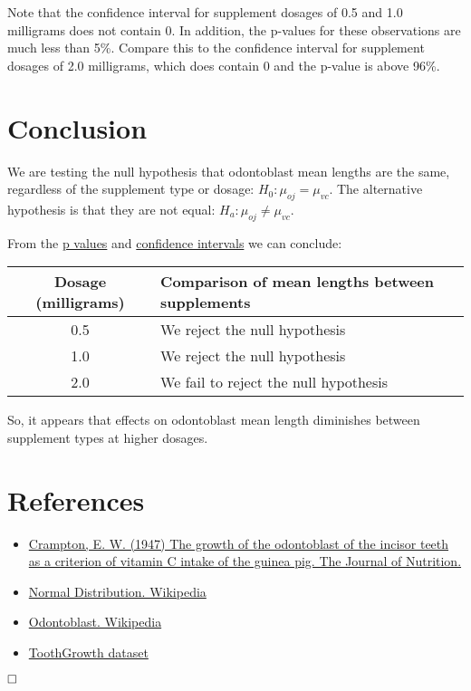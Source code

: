 \documentclass[legalpaper]{article}
\begin{document}
Note that the confidence interval for supplement dosages of 0.5 and 1.0
milligrams does not contain 0. In addition, the p-values for these
observations are much less than 5\%. Compare this to the confidence
interval for supplement dosages of 2.0 milligrams, which does contain 0
and the p-value is above 96\%.

\section{Conclusion}\label{conclusion}

We are testing the null hypothesis that odontoblast mean lengths are the
same, regardless of the supplement type or dosage:
\(H_0 : \mu_{oj} = \mu_{vc}\). The alternative hypothesis is that they
are not equal: \(H_a : \mu_{oj} \ne \mu_{vc}\).

From the \href{https://en.wikipedia.org/wiki/P-value}{p values} and
\href{https://en.wikipedia.org/wiki/Confidence_interval}{confidence
intervals} we can conclude:

\begin{longtable}[c]{@{}cl@{}}
\toprule
Dosage (milligrams) & Comparison of mean lengths between
supplements\tabularnewline
\midrule
\endhead
0.5 & We reject the null hypothesis\tabularnewline
1.0 & We reject the null hypothesis\tabularnewline
2.0 & We fail to reject the null hypothesis\tabularnewline
\bottomrule
\end{longtable}

So, it appears that effects on odontoblast mean length diminishes
between supplement types at higher dosages.

\section{References}\label{references}

\begin{itemize}
\itemsep1pt\parskip0pt
\item
  \href{http://jn.nutrition.org/content/33/5/491.full.pdf}{Crampton, E.
  W. (1947) The growth of the odontoblast of the incisor teeth as a
  criterion of vitamin C intake of the guinea pig. The Journal of
  Nutrition.}
\item
  \href{https://en.wikipedia.org/wiki/Normal_distribution}{Normal
  Distribution. Wikipedia}
\item
  \href{https://en.wikipedia.org/wiki/Odontoblast}{Odontoblast.
  Wikipedia}
\item
  \href{https://stat.ethz.ch/R-manual/R-devel/library/datasets/html/ToothGrowth.html}{ToothGrowth
  dataset}
\end{itemize}

\(\hfill \square\)
\end{document}
